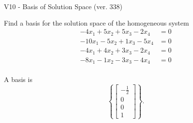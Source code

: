 \begin{exercise}
  \begin{exerciseTitle}V10 - Basis of Solution Space (ver. 338)\end{exerciseTitle}
  \begin{exerciseStatement}
    Find a basis for the solution space of the homogeneous system 
\begin{align*}
 -4 x_ 1 + 5 x_ 2 + 5 x_ 3 -2 x_ 4 &= 0  \\ 
  -10 x_ 1 -5 x_ 2 + 1 x_ 3 -5 x_ 4 &= 0  \\ 
  -4 x_ 1 + 4 x_ 2 + 3 x_ 3 -2 x_ 4 &= 0  \\ 
  -8 x_ 1 -1 x_ 2 -3 x_ 3 -4 x_ 4 &= 0  \\ 
 \end{align*}


 
  \end{exerciseStatement}

  \begin{exerciseAnswer}
   A basis is   
\[\left\{\left[\begin{array}{c}
-\frac{1}{2} \\
0 \\
0 \\
1
\end{array}\right]\right\}.\]

  


  \end{exerciseAnswer}
\end{exercise}